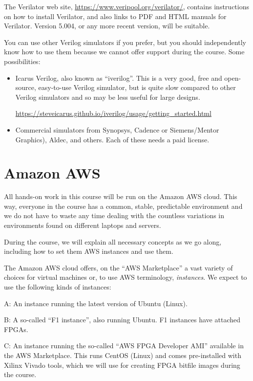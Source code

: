 The Verilator web site, \url{https://www.veripool.org/verilator/},
contains instructions on how to install Verilator, and also links to
PDF and HTML manuals for Verilator.  Version 5.004, or any more recent
version, will be suitable.

You can use other Verilog simulators if you prefer, but you should
independently know how to use them because we cannot offer support
during the course.  Some possibilities:

\begin{itemize}

  \item Icarus Verilog, also known as ``iverilog''.  This is a very
    good, free and open-source, easy-to-use Verilog simulator, but is
   quite slow compared to other Verilog simulators and so may be less
    useful for large designs.

    \url{https://steveicarus.github.io/iverilog/usage/getting_started.html}

  \item Commercial simulators from Synopsys, Cadence or Siemens/Mentor
    Graphics), Aldec, and others.  Each of these needs a paid license.

\end{itemize}


\section{Amazon AWS}

\label{sec_AWS}

All hands-on work in this course will be run on the Amazon AWS cloud.
This way, everyone in the course has a common, stable, predictable
environment and we do not have to waste any time dealing with the
countless variations in environments found on different laptops and
servers.

During the course, we will explain all necessary concepts as we go
along, including how to set them AWS instances and use them.

The Amazon AWS cloud offers, on the ``AWS Marketplace'' a vast variety
of choices for virtual machines or, to use AWS terminology,
\emph{instances}.  We expect to use the following kinds of instances:

\begin{tightlist}

  \item[A:] An instance running the latest version of Ubuntu (Linux).

  \item[B:] A so-called ``F1 instance'', also running Ubuntu.  F1
    instances have attached FPGAs.

  \item[C:] An instance running the so-called ``AWS FPGA Developer
    AMI'' available in the AWS Marketplace.  This runs CentOS (Linux)
    and comes pre-installed with Xilinx Vivado tools, which we will
    use for creating FPGA bitfile images during the course.

\end{tightlist}


